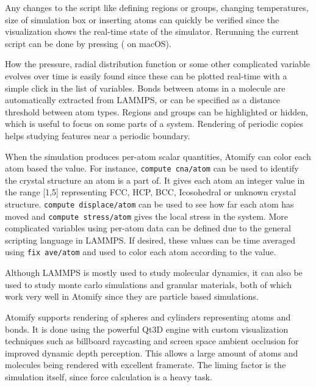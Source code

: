 \documentclass[12pt,a4paper,final]{iopart}
\newcommand{\code}[1]{\colorbox{light-gray}{\color{RawSienna}\texttt{#1}}}
\begin{document}
Any changes to the script like defining regions or groups,
changing temperatures, size of simulation box or inserting atoms can
quickly be verified since the visualization shows the real-time state of the simulator.
Rerunning the current script can be done by pressing  ( on macOS).

How the pressure, radial distribution function or some other
complicated variable evolves over time is easily found
since these can be plotted real-time with a simple click in the list of variables.
Bonds between atoms in a molecule are automatically extracted from LAMMPS, or can
be specified as a distance threshold between atom types.
Regions and groups can be highlighted or hidden, which is useful to focus on some parts of a system.
Rendering of periodic copies helps studying features near a periodic boundary.

When the simulation produces per-atom scalar quantities, Atomify can color each atom based the value.
For instance, \code{compute cna/atom}\cite{faken1994systematic, tsuzuki2007structural} can be used to identify the crystal structure an atom is a part of.
It gives each atom an integer value in the range [1,5] representing FCC, HCP, BCC, Icosohedral or unknown crystal structure.
\code{compute displace/atom} can be used to see how far each atom has moved and \code{compute stress/atom} gives the local stress in the system.
More complicated variables using per-atom data can be defined due to the general scripting language in LAMMPS.
If desired, these values can be time averaged using \code{fix ave/atom} and used to color each atom according to the value.

Although LAMMPS is mostly used to study molecular dynamics, it can also be used to
study monte carlo simulations\cite{frenkel2001understanding} and granular
materials\cite{brilliantov1996model, silbert2001granular, zhang2005jamming},
both of which work very well in Atomify since they are particle based simulations.

Atomify supports rendering of spheres and cylinders representing atoms and bonds.
It is done using the powerful Qt3D engine with custom visualization techniques such as
billboard raycasting\cite{gumhold2003splatting, sigg2006gpu, tarini2006ambient} and screen space ambient occlusion\cite{bavoil2008screen}
for improved dynamic depth perception. This allows a large amount of atoms and molecules being rendered with excellent framerate.
The liming factor is the simulation itself, since force calculation is a heavy task.
\end{document}
